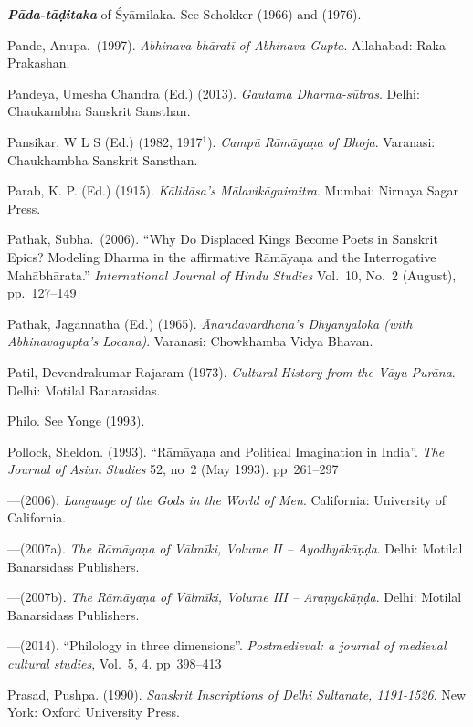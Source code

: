\begin{thebibliography}{99}
{\sl\bfseries Pāda-tāḍitaka} of Śyāmilaka. See Schokker (1966) and (1976).

Pande, Anupa.\ (1997). {\sl Abhinava-bhāratī of Abhinava Gupta}. Allahabad: Raka Prakashan. 

Pandeya, Umesha Chandra (Ed.) (2013). {\sl Gautama Dharma-sūtras}. Delhi: Chaukambha Sanskrit Sansthan. 

Pansikar, W L S (Ed.) (1982, 1917$^{1}$). {\sl Campū Rāmāyaṇa of Bhoja}. Varanasi: Chaukhambha Sanskrit Sansthan.

Parab, K. P. (Ed.) (1915). {\sl Kālidāsa’s Mālavikāgnimitra}. Mumbai: Nirnaya Sagar Press. 

Pathak, Subha.\ (2006). “Why Do Displaced Kings Become Poets in Sanskrit Epics? Modeling Dharma in the affirmative Rāmāyaṇa and the Interrogative Mahābhārata.” {\sl International Journal of Hindu Studies} Vol.~10, No.~2 (August), pp.~127--149

Pathak, Jagannatha (Ed.) (1965). {\sl Ānandavardhana’s Dhyanyāloka (with Abhinavagupta’s Locana)}. Varanasi: Chowkhamba Vidya Bhavan. 

Patil, Devendrakumar Rajaram (1973). {\sl Cultural History from the Vāyu-Purāna}. Delhi: Motilal Banarasidas. 

Philo. See Yonge (1993).

Pollock, Sheldon. (1993). “Rāmāyaṇa and Political Imagination in India”. {\sl The Journal of Asian Studies} 52, no~2 (May 1993). pp~261--297

---\kern3pt(2006). {\sl Language of the Gods in the World of Men}. California: University of California. 

---\kern3pt(2007a). {\sl The Rāmāyaṇa of Vālmīki, Volume II – Ayodhyākāṇḍa}. Delhi: Motilal Banarsidass Publishers. 

---\kern3pt(2007b). {\sl The Rāmāyaṇa of Vālmīki, Volume III – Araṇyakāṇḍa}. Delhi: Motilal Banarsidass Publishers. 

---\kern3pt(2014). “Philology in three dimensions”. {\sl Postmedieval: a journal of medieval cultural studies}, Vol.~5, 4. pp~398--413

Prasad, Pushpa. (1990). {\sl Sanskrit Inscriptions of Delhi Sultanate, 1191-1526}. New York: Oxford University Press. 


\end{thebibliography}
